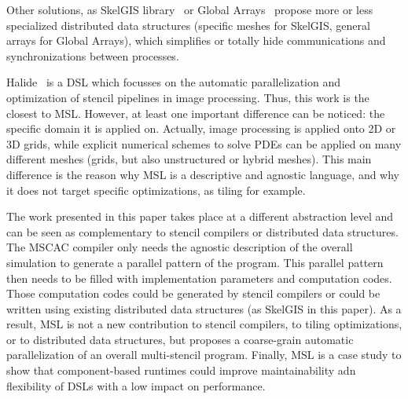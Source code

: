 Other solutions, as SkelGIS library~\cite{CPE:CPE3494} or Global Arrays~\cite{Nieplocha:2006:AAP:1125980.1125985} propose more or less specialized distributed data structures (specific meshes for SkelGIS, general arrays for Global Arrays), which simplifies or totally hide communications and synchronizations between processes.

Halide~\cite{Ragan-Kelley:2013:HLC:2491956.2462176} is a DSL which focusses on the automatic parallelization and optimization of stencil pipelines in image processing. Thus, this work is the closest to MSL. However, at least one important difference can be noticed: the specific domain it is applied on. Actually, image processing is applied onto 2D or 3D grids, while explicit numerical schemes to solve PDEs can be applied on many different meshes (grids, but also unstructured or hybrid meshes). This main difference is the reason why MSL is a descriptive and agnostic language, and why it does not target specific optimizations, as tiling for example.%

The work presented in this paper takes place at a different abstraction level and can be seen as complementary to stencil compilers or distributed data structures. The MSCAC compiler only needs the agnostic description of the overall simulation to generate a parallel pattern of the program. This parallel pattern then needs to be filled with implementation parameters and computation codes.
Those computation codes could be generated by stencil compilers or could be written using existing distributed data structures (as SkelGIS in this paper). As a result, MSL is not a new contribution to stencil compilers, to tiling optimizations, or to distributed data structures, but proposes a coarse-grain automatic parallelization of an overall multi-stencil program.
Finally, MSL is a case study to show that component-based runtimes could improve maintainability adn flexibility of DSLs with a low impact on performance. 



